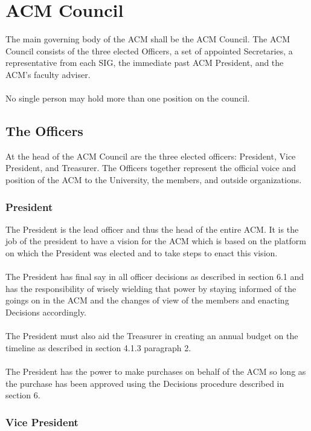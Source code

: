 \documentclass[12pt,titlepage]{article}
\begin{document}
\section{ACM Council}

The main governing body of the ACM shall be the ACM Council. The ACM Council consists of the three elected Officers, a set of appointed Secretaries, a representative from each SIG, the immediate past ACM President, and the ACM's faculty adviser.\\
\\
No single person may hold more than one position on the council.\\

\subsection{The Officers}

At the head of the ACM Council are the three elected officers: President, Vice President, and Treasurer. The Officers together represent the official voice and position of the ACM to the University, the members, and outside organizations.

\subsubsection{President}

The President is the lead officer and thus the head of the entire ACM. It is the job of the president to have a vision for the ACM which is based on the platform on which the President was elected and to take steps to enact this vision.\\
\\
The President has final say in all officer decisions as described in section 6.1 and has the responsibility of wisely wielding that power by staying informed of the goings on in the ACM and the changes of view of the members and enacting Decisions accordingly.\\
\\
The President must also aid the Treasurer in creating an annual budget on the timeline as described in section 4.1.3 paragraph 2.\\
\\
The President has the power to make purchases on behalf of the ACM so long as the purchase has been approved using the Decisions procedure described in section 6.

\subsubsection{Vice President}
\end{document}
